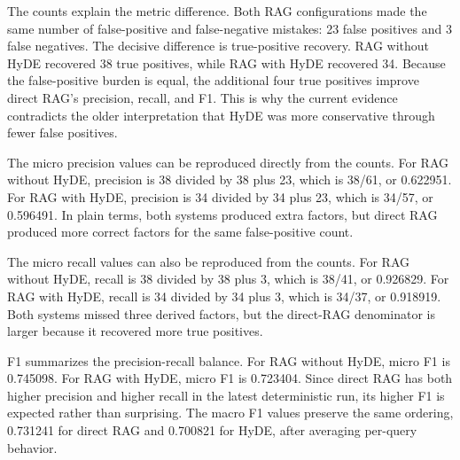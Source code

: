 The counts explain the metric difference. Both RAG configurations made the same number of false-positive and false-negative mistakes: 23 false positives and 3 false negatives. The decisive difference is true-positive recovery. RAG without HyDE recovered 38 true positives, while RAG with HyDE recovered 34. Because the false-positive burden is equal, the additional four true positives improve direct RAG's precision, recall, and F1. This is why the current evidence contradicts the older interpretation that HyDE was more conservative through fewer false positives.

The micro precision values can be reproduced directly from the counts. For RAG without HyDE, precision is 38 divided by 38 plus 23, which is 38/61, or 0.622951. For RAG with HyDE, precision is 34 divided by 34 plus 23, which is 34/57, or 0.596491. In plain terms, both systems produced extra factors, but direct RAG produced more correct factors for the same false-positive count.

The micro recall values can also be reproduced from the counts. For RAG without HyDE, recall is 38 divided by 38 plus 3, which is 38/41, or 0.926829. For RAG with HyDE, recall is 34 divided by 34 plus 3, which is 34/37, or 0.918919. Both systems missed three derived factors, but the direct-RAG denominator is larger because it recovered more true positives.

F1 summarizes the precision-recall balance. For RAG without HyDE, micro F1 is 0.745098. For RAG with HyDE, micro F1 is 0.723404. Since direct RAG has both higher precision and higher recall in the latest deterministic run, its higher F1 is expected rather than surprising. The macro F1 values preserve the same ordering, 0.731241 for direct RAG and 0.700821 for HyDE, after averaging per-query behavior.

